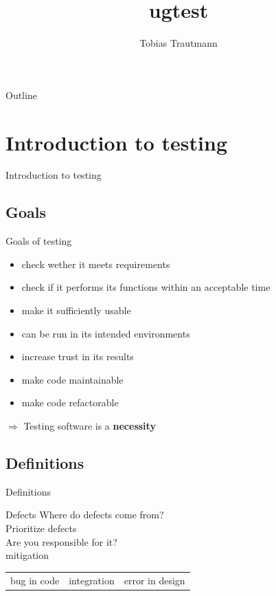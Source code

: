 \documentclass{beamer}
\title[ugtest]{ugtest}
\author{Tobias Trautmann}
\institute{GCSC}
\newcommand{\sectiontitle}[1]{
    \section{#1}
    \begin{frame}
        \centering
        \LARGE{#1}
    \end{frame}
}
\newcommand{\subsectiontitle}[1]{
    \subsection{#1}
    \begin{frame}
        \LARGE{#1}
    \end{frame}
}
\begin{document}
    \begin{frame}
        \titlepage
    \end{frame}

    \begin{frame}{Outline}
        \tableofcontents
    \end{frame}


    \sectiontitle{Introduction to testing}
        \subsection{Goals}
        \begin{frame}{Goals of testing}
           \begin{itemize}
               \item check wether it meets requirements\pause
               \item check if it performs its functions within an acceptable time\pause
               \item make it sufficiently usable\pause
               \item can be run in its intended environments\pause%
               \item increase trust in its results\pause
               \item make code maintainable\pause
               \item make code refactorable
           \end{itemize}
           \Large{$\Rightarrow$ Testing software is a \textbf{necessity}}
        \end{frame}

        \subsectiontitle{Definitions}
        \begin{frame}{Defects}
            Where do defects come from?\\
            Prioritize defects\\
            Are you responsible for it?\\
            mitigation
            \begin{tabular}{c|c|c}
                bug in code   & integration & error in design \\
            \end{tabular}
        \end{frame}
\end{document}
